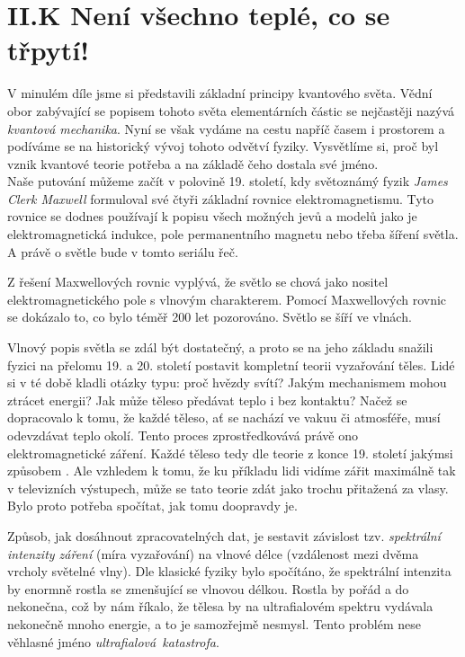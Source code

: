 \documentclass{../../../../style/mkimain}
\begin{document}
\section*{II.K Není všechno teplé, co se třpytí!}
V minulém díle jsme si představili základní principy kvantového světa.
Vědní obor zabývající se popisem tohoto světa elementárních částic se nejčastěji nazývá \textit{kvantová mechanika}.
Nyní se však vydáme na cestu napříč časem i prostorem a podíváme se na historický vývoj tohoto odvětví fyziky.
Vysvětlíme si, proč byl vznik kvantové teorie potřeba a na základě čeho dostala své jméno.
\\

Naše putování můžeme začít v polovině 19. století,
kdy světoznámý fyzik \textit{James Clerk Maxwell} formuloval své čtyři základní rovnice elektromagnetismu.
Tyto rovnice se dodnes používají k popisu všech možných jevů a modelů jako je elektromagnetická indukce,
pole permanentního magnetu nebo třeba šíření světla.
A právě o světle bude v tomto seriálu řeč.

Z řešení Maxwellových rovnic vyplývá, že světlo se chová jako nositel elektromagnetického pole s vlnovým charakterem.
Pomocí Maxwellových rovnic se dokázalo to, co bylo téměř 200 let pozorováno. Světlo se šíří ve vlnách.

Vlnový popis světla se zdál být dostatečný,
a proto se na jeho základu snažili fyzici na přelomu 19. a 20. století postavit kompletní teorii vyzařování těles.
Lidé si v té době kladli otázky typu: proč hvězdy svítí?
Jakým mechanismem mohou ztrácet energii? Jak může těleso předávat teplo i bez kontaktu? Načež se dopracovalo k tomu,
že každé těleso, ať se nachází ve vakuu či atmosféře, musí odevzdávat teplo okolí.
Tento proces zprostředkovává právě ono elektromagnetické záření.
Každé těleso tedy dle teorie z konce 19. století jakýmsi způsobem .
Ale vzhledem k tomu, že ku příkladu lidi vidíme zářit maximálně tak v televizních výstupech,
může se tato teorie zdát jako trochu přitažená za vlasy.
Bylo proto potřeba spočítat, jak tomu doopravdy je.

Způsob, jak dosáhnout zpracovatelných dat,
je sestavit závislost tzv. \textit{spektrální intenzity záření} (míra vyzařování) na vlnové délce (vzdálenost mezi dvěma vrcholy světelné vlny).
Dle klasické fyziky bylo spočítáno, že spektrální intenzita by enormně rostla se zmenšující se vlnovou délkou.
Rostla by pořád a do nekonečna, což by nám říkalo, že tělesa by na ultrafialovém spektru vydávala nekonečně mnoho energie,
a to je samozřejmě nesmysl.
Tento problém nese věhlasné jméno \textit{ultrafialová~katastrofa}.
\end{document}
